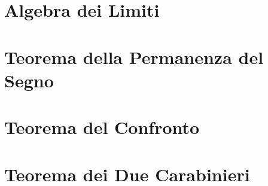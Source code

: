 \documentclass[a4paper, twoside, italian, 11pt]{book}
\begin{document}
\section{Algebra dei Limiti}




\section{Teorema della Permanenza del Segno}




\section{Teorema del Confronto}




\section{Teorema dei Due Carabinieri}

\end{document}
